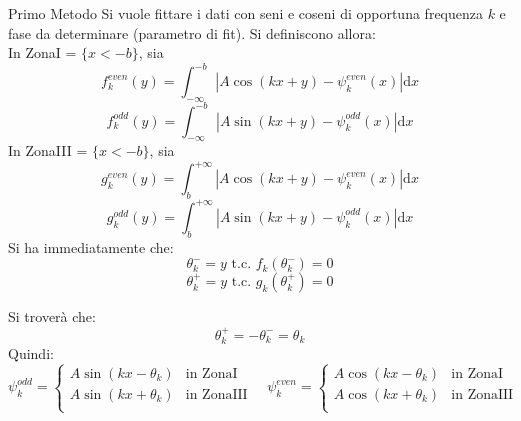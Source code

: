 \begin{paragraph}{Primo Metodo}
Si vuole fittare i dati con seni e coseni di opportuna frequenza $k$
e fase da determinare (parametro di fit). Si definiscono allora:\\
  In ZonaI = $\{x<-b\}$, sia
        $$f^{even}_k(y) = \int_{-\infty}^{-b} | A\cos(kx+y)-\psi_k^{even}(x)| \mathrm d x $$
        $$f^{odd}_k(y) = \int_{-\infty}^{-b} | A\sin(kx+y)-\psi_k^{odd}(x)| \mathrm d x $$
  In ZonaIII = $\{x<-b\}$, sia
        $$g^{even}_k(y) = \int_{b}^{+\infty} |A\cos(kx+y)-\psi_k^{even}(x)| \mathrm d x $$
        $$g^{odd}_k(y) = \int_{b}^{+\infty} |A\sin(kx+y)-\psi_k^{odd}(x)| \mathrm d x $$
Si ha immediatamente che:
    $$ \theta^-_k = y \mbox{ t.c. } f_k(\theta^-_k) = 0 $$
    $$ \theta^+_k = y \mbox{ t.c. } g_k(\theta^+_k) = 0 $$
\end{paragraph}
Si troverà che:
    $$ \theta^+_k = -\theta^-_k = \theta_k $$
Quindi:
$$ \psi_k^{odd} = \begin{cases}
    A\sin(kx - \theta_k) & \mbox{in ZonaI} \\
    A\sin(kx + \theta_k) & \mbox{in ZonaIII} \\
\end{cases}
\quad
\psi_k^{even} = \begin{cases}
    A\cos(kx - \theta_k) & \mbox{in ZonaI} \\
    A\cos(kx + \theta_k) & \mbox{in ZonaIII} \\
\end{cases}
$$
